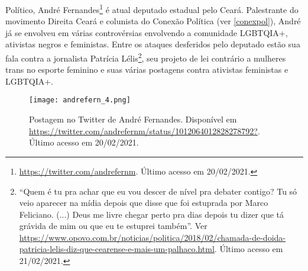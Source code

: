 \documentclass[
	12pt,				%
	openright,			%
	twoside,			%
	a4paper,			%
	english,			%
	brazil				%
	]{abntex2}
\begin{document}
\begin{anexosenv}
\begin{enumerate}
 Político, André Fernandes\footnote{\url{https://twitter.com/andrefernm}. Último acesso em 20/02/2021.} é atual deputado estadual pelo Ceará. Palestrante do movimento Direita Ceará e colunista do Conexão Política (ver \ref{conexpol}), André já se envolveu em várias controvérsias envolvendo a comunidade LGBTQIA+, ativistas negros e feministas. Entre os ataques desferidos pelo deputado estão sua fala contra a jornalista Patrícia Lélis\footnote{``Quem é tu pra achar que eu vou descer de nível pra debater contigo? Tu só veio aparecer na mídia depois que disse que foi estuprada por Marco Feliciano. (...) Deus me livre chegar perto pra dias depois tu dizer que tá grávida de mim ou que eu te estuprei também''. Ver \url{https://www.opovo.com.br/noticias/politica/2018/02/chamada-de-doida-patricia-lelis-diz-que-cearense-e-mais-um-palhaco.html}. Último acesso em 21/02/2021.}, seu projeto de lei contrário a mulheres trans no esporte feminino e suas várias postagens contra ativistas feministas e LGBTQIA+.
 
 
 
 
 \begin{figure}[!htbp]
    \centering
    \texttt{[image: andrefern\_4.png]}
    \caption{Postagem no Twitter de André Fernandes. Disponível em \url{https://twitter.com/andrefernm/status/1012064012828278792?}. Último acesso em 20/02/2021.}
 \end{figure}
 

\end{enumerate}
\end{anexosenv}
\end{document}

